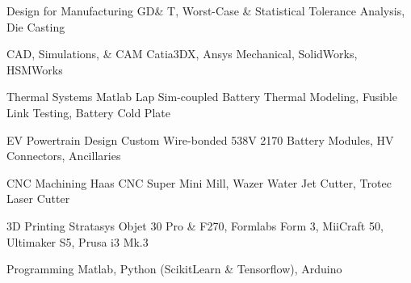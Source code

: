 


\begin{cvskills}







\cvskill
{Design for Manufacturing}
{GD\& T, Worst-Case \& Statistical Tolerance Analysis, Die Casting}

\cvskill
{CAD, Simulations, \& CAM} %
{Catia3DX, Ansys Mechanical, SolidWorks, HSMWorks} %

\cvskill
{Thermal Systems}
{Matlab Lap Sim-coupled Battery Thermal Modeling, Fusible Link Testing, Battery Cold Plate}

\cvskill
{EV Powertrain Design}
{Custom Wire-bonded 538V 2170 Battery Modules, HV Connectors, Ancillaries}

\cvskill
{CNC Machining}
{Haas CNC Super Mini Mill, Wazer Water Jet Cutter, Trotec Laser Cutter}

\cvskill
{3D Printing} %
{Stratasys Objet 30 Pro \& F270, Formlabs Form 3, MiiCraft 50, Ultimaker S5, Prusa i3 Mk.3} %

\cvskill
{Programming} %
{Matlab, Python (ScikitLearn \& Tensorflow), Arduino} %



\end{cvskills}